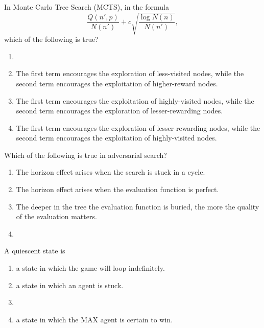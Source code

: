 \documentclass[11pt, a4paper]{exam}
\begin{document}
\begin{quiz}
    \item In Monte Carlo Tree Search (MCTS), in the formula
    \begin{equation*}
        \frac{Q(n', p)}{N(n')} + c \sqrt{\frac{\log N(n)}{N(n')}},
    \end{equation*}
    which of the following is true?
    \begin{enumerate}[label=$\bigcirc$]
        \item {}
        \item The first term encourages the exploration of less-visited nodes, while the second term encourages the exploitation of higher-reward nodes.
        \item The first term encourages the exploitation of highly-visited nodes, while the second term encourages the exploration of lesser-rewarding nodes.
        \item The first term encourages the exploration of lesser-rewarding nodes, while the second term encourages the exploitation of highly-visited nodes.
    \end{enumerate}

    \item Which of the following is true in adversarial search?
    \begin{enumerate}[label=$\bigcirc$]
        \item The horizon effect arises when the search is stuck in a cycle.
        \item The horizon effect arises when the evaluation function is perfect.
        \item The deeper in the tree the evaluation function is buried, the more the quality of the evaluation matters.
        \item {}
    \end{enumerate}

    \item A quiescent state is
    \begin{enumerate}[label=$\bigcirc$]
        \item a state in which the game will loop indefinitely.
        \item a state in which an agent is stuck.
        \item {}
        \item a state in which the MAX agent is certain to win.
    \end{enumerate}


\end{quiz}
\end{document}
